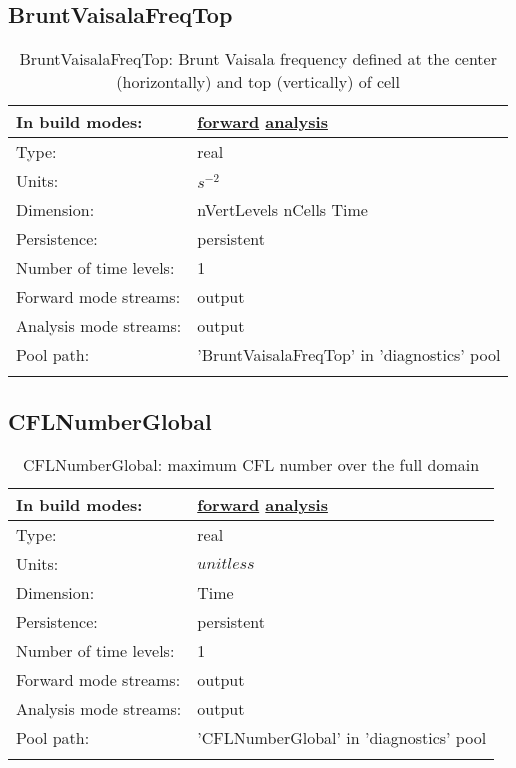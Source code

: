 \subsection[BruntVaisalaFreqTop]{BruntVaisalaFreqTop}
\label{subsec:var_sec_diagnostics_BruntVaisalaFreqTop}
\begin{center}
\begin{longtable}{| p{2.0in} | p{4.0in} |}
        \hline 
        In build modes: & \hyperref[subsec:forward_var_tab_diagnostics]{forward} \hyperref[subsec:analysis_var_tab_diagnostics]{analysis} \\
        \hline 
        Type: & real \\
        \hline 
        Units: & $s^{-2}$ \\
        \hline 
        Dimension: & nVertLevels nCells Time \\
        \hline 
        Persistence: & persistent \\
        \hline 
        Number of time levels: & 1 \\
        \hline 
		 Forward mode streams: &  output \\
        \hline 
		 Analysis mode streams: &  output \\
        \hline 
            Pool path: & 'BruntVaisalaFreqTop' in 'diagnostics' pool
 \\
		 \hline 
    \caption{BruntVaisalaFreqTop: Brunt Vaisala frequency defined at the center (horizontally) and top (vertically) of cell}
\end{longtable}
\end{center}
\subsection[CFLNumberGlobal]{CFLNumberGlobal}
\label{subsec:var_sec_diagnostics_CFLNumberGlobal}
\begin{center}
\begin{longtable}{| p{2.0in} | p{4.0in} |}
        \hline 
        In build modes: & \hyperref[subsec:forward_var_tab_diagnostics]{forward} \hyperref[subsec:analysis_var_tab_diagnostics]{analysis} \\
        \hline 
        Type: & real \\
        \hline 
        Units: & $unitless$ \\
        \hline 
        Dimension: & Time \\
        \hline 
        Persistence: & persistent \\
        \hline 
        Number of time levels: & 1 \\
        \hline 
		 Forward mode streams: &  output \\
        \hline 
		 Analysis mode streams: &  output \\
        \hline 
            Pool path: & 'CFLNumberGlobal' in 'diagnostics' pool
 \\
		 \hline 
    \caption{CFLNumberGlobal: maximum CFL number over the full domain}
\end{longtable}
\end{center}
